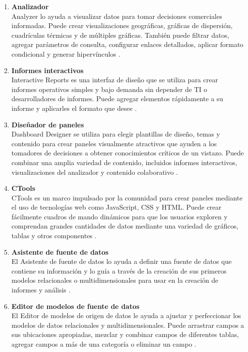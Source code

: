 \begin{spacing}{1.5}
\begin{enumerate}[label=\alph*)]
			\item \textbf{Analizador}\\
			Analyzer lo ayuda a visualizar datos para tomar decisiones comerciales informadas. Puede crear visualizaciones geográficas, gráficas de dispersión, cuadrículas térmicas y de múltiples gráficas. También puede filtrar datos, agregar parámetros de consulta, configurar enlaces detallados, aplicar formato condicional y generar hipervínculos \cite{chap2_pentaho}.
			
			\item \textbf{Informes interactivos}\\
			Interactive Reports es una interfaz de diseño que se utiliza para crear informes operativos simples y bajo demanda sin depender de TI o desarrolladores de informes. Puede agregar elementos rápidamente a su informe y aplicarles el formato que desee \cite{chap2_pentaho}.
			
			\item \textbf{Diseñador de paneles}\\
			Dashboard Designer se utiliza para elegir plantillas de diseño, temas y contenido para crear paneles visualmente atractivos que ayuden a los tomadores de decisiones a obtener conocimientos críticos de un vistazo. Puede combinar una amplia variedad de contenido, incluidos informes interactivos, visualizaciones del analizador y contenido colaborativo \cite{chap2_pentaho}.
			
			\item \textbf{CTools}\\
			CTools es un marco impulsado por la comunidad para crear paneles mediante el uso de tecnologías web como JavaScript, CSS y HTML. Puede crear fácilmente cuadros de mando dinámicos para que los usuarios exploren y comprendan grandes cantidades de datos mediante una variedad de gráficos, tablas y otros componentes \cite{chap2_pentaho}.
			
			\item \textbf{Asistente de fuente de datos}\\
			El Asistente de fuente de datos lo ayuda a definir una fuente de datos que contiene su información y lo guía a través de la creación de sus primeros modelos relacionales o multidimensionales para usar en la creación de informes y análisis \cite{chap2_pentaho}.
			
			\item \textbf{Editor de modelos de fuente de datos}\\
			El Editor de modelos de origen de datos le ayuda a ajustar y perfeccionar los modelos de datos relacionales y multidimensionales. Puede arrastrar campos a sus ubicaciones apropiadas, mezclar y combinar campos de diferentes tablas, agregar campos a más de una categoría o eliminar un campo \cite{chap2_pentaho}.
		\end{enumerate}

\end{spacing}
